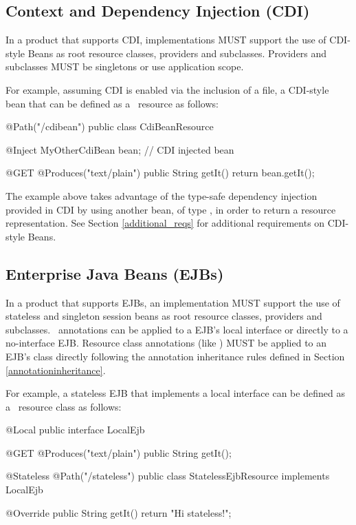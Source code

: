 \subsection{Context and Dependency Injection (CDI)}
\label{cdi}
In a product that supports CDI, implementations MUST support the use of CDI-style Beans as root resource classes, providers and  subclasses. Providers and  subclasses MUST be singletons or use application scope. 

For example, assuming CDI is enabled via the inclusion of a  file, a CDI-style bean that can be defined as a \jaxrs\ resource as follows:

\begin{listing}{1}
@Path("/cdibean")
public class CdiBeanResource {

	@Inject MyOtherCdiBean bean;		// CDI injected bean

    @GET
    @Produces("text/plain")
    public String getIt() {
        return bean.getIt();
    }
}
\end{listing}

The example above takes advantage of the type-safe dependency injection provided in CDI by using another bean, of type , in order to return a resource representation. See Section \ref{additional_reqs} for additional requirements on CDI-style Beans.

\subsection{Enterprise Java Beans (EJBs)}
\label{ejbs}

In a product that supports EJBs, an implementation MUST support the use of stateless and singleton session beans as root resource classes, providers and  subclasses. 
\jaxrs\ annotations can be applied to a EJB's local interface or directly to a no-interface EJB. Resource class annotations (like \Path) MUST be applied to an EJB's class directly following the annotation inheritance rules defined in Section \ref{annotationinheritance}.

For example, a stateless EJB that implements a local interface can be defined as a \jaxrs\ resource class as follows:

\begin{listing}{1}
@Local
public interface LocalEjb {

    @GET
    @Produces("text/plain")
    public String getIt();
}

@Stateless
@Path("/stateless")
public class StatelessEjbResource implements LocalEjb {

    @Override
    public String getIt() {
        return "Hi stateless!";
    }
}
\end{listing}

